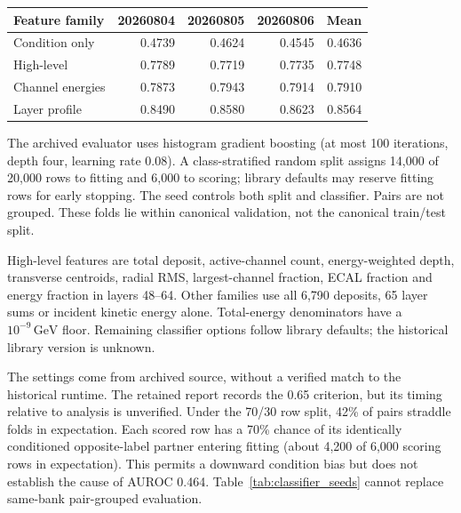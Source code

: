 \documentclass[10pt]{article}
\newcommand{\GeV}{\,\mathrm{GeV}}
\begin{document}
\begin{center}
\begin{minipage}{\linewidth}
\centering
{}
\label{tab:classifier_seeds}
\small
\begin{tabular}{@{}lrrrr@{}}
\toprule
Feature family & 20260804 & 20260805 & 20260806 & Mean \\
\midrule
Condition only & 0.4739 & 0.4624 & 0.4545 & 0.4636 \\
High-level & 0.7789 & 0.7719 & 0.7735 & 0.7748 \\
Channel energies & 0.7873 & 0.7943 & 0.7914 & 0.7910 \\
Layer profile & 0.8490 & 0.8580 & 0.8623 & 0.8564 \\
\bottomrule
\end{tabular}
\end{minipage}
\end{center}

The archived evaluator uses histogram gradient boosting (at most 100 iterations, depth four, learning rate 0.08). A class-stratified random split assigns 14,000 of 20,000 rows to fitting and 6,000 to scoring; library defaults may reserve fitting rows for early stopping. The seed controls both split and classifier. Pairs are not grouped. These folds lie within canonical validation, not the canonical train/test split.

High-level features are total deposit, active-channel count, energy-weighted depth, transverse centroids, radial RMS, largest-channel fraction, ECAL fraction and energy fraction in layers 48--64. Other families use all 6,790 deposits, 65 layer sums or incident kinetic energy alone. Total-energy denominators have a $10^{-9}\GeV$ floor. Remaining classifier options follow library defaults; the historical library version is unknown.

The settings come from archived source, without a verified match to the historical runtime. The retained report records the 0.65 criterion, but its timing relative to analysis is unverified. Under the 70/30 row split, 42\% of pairs straddle folds in expectation. Each scored row has a 70\% chance of its identically conditioned opposite-label partner entering fitting (about 4,200 of 6,000 scoring rows in expectation). This permits a downward condition bias but does not establish the cause of AUROC 0.464. Table~\ref{tab:classifier_seeds} cannot replace same-bank pair-grouped evaluation.

\printbibliography
\end{document}
